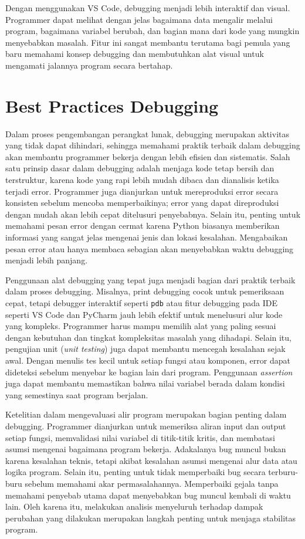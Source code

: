 Dengan menggunakan VS Code, debugging menjadi lebih interaktif dan visual. Programmer dapat melihat dengan jelas bagaimana data mengalir melalui program, bagaimana variabel berubah, dan bagian mana dari kode yang mungkin menyebabkan masalah. Fitur ini sangat membantu terutama bagi pemula yang baru memahami konsep debugging dan membutuhkan alat visual untuk mengamati jalannya program secara bertahap.



\section{Best Practices Debugging}

Dalam proses pengembangan perangkat lunak, debugging merupakan aktivitas yang tidak dapat dihindari, sehingga memahami praktik terbaik dalam debugging akan membantu programmer bekerja dengan lebih efisien dan sistematis. Salah satu prinsip dasar dalam debugging adalah menjaga kode tetap bersih dan terstruktur, karena kode yang rapi lebih mudah dibaca dan dianalisis ketika terjadi error. Programmer juga dianjurkan untuk mereproduksi error secara konsisten sebelum mencoba memperbaikinya; error yang dapat direproduksi dengan mudah akan lebih cepat ditelusuri penyebabnya. Selain itu, penting untuk memahami pesan error dengan cermat karena Python biasanya memberikan informasi yang sangat jelas mengenai jenis dan lokasi kesalahan. Mengabaikan pesan error atau hanya membaca sebagian akan menyebabkan waktu debugging menjadi lebih panjang.

Penggunaan alat debugging yang tepat juga menjadi bagian dari praktik terbaik dalam proses debugging. Misalnya, print debugging cocok untuk pemeriksaan cepat, tetapi debugger interaktif seperti \texttt{pdb} atau fitur debugging pada IDE seperti VS Code dan PyCharm jauh lebih efektif untuk menelusuri alur kode yang kompleks. Programmer harus mampu memilih alat yang paling sesuai dengan kebutuhan dan tingkat kompleksitas masalah yang dihadapi. Selain itu, pengujian unit (\textit{unit testing}) juga dapat membantu mencegah kesalahan sejak awal. Dengan menulis tes kecil untuk setiap fungsi atau komponen, error dapat dideteksi sebelum menyebar ke bagian lain dari program. Penggunaan \textit{assertion} juga dapat membantu memastikan bahwa nilai variabel berada dalam kondisi yang semestinya saat program berjalan.

Ketelitian dalam mengevaluasi alir program merupakan bagian penting dalam debugging. Programmer dianjurkan untuk memeriksa aliran input dan output setiap fungsi, memvalidasi nilai variabel di titik-titik kritis, dan membatasi asumsi mengenai bagaimana program bekerja. Adakalanya bug muncul bukan karena kesalahan teknis, tetapi akibat kesalahan asumsi mengenai alur data atau logika program. Selain itu, penting untuk tidak memperbaiki bug secara terburu-buru sebelum memahami akar permasalahannya. Memperbaiki gejala tanpa memahami penyebab utama dapat menyebabkan bug muncul kembali di waktu lain. Oleh karena itu, melakukan analisis menyeluruh terhadap dampak perubahan yang dilakukan merupakan langkah penting untuk menjaga stabilitas program.

